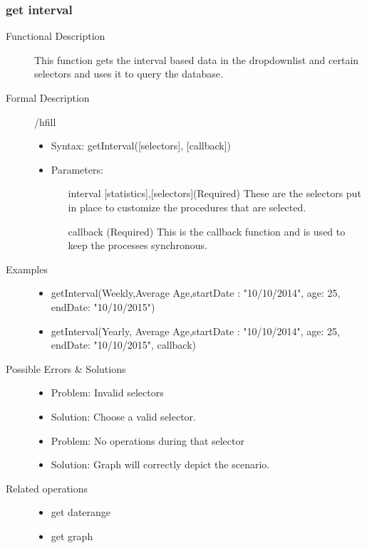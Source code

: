 \documentclass[14pt, a4paper]{article}
\begin{document}
\subsubsection{get interval}
\begin{description}
\item[Functional Description] This function gets the interval based data in the dropdownlist and certain selectors and uses it to query the database.
\item[Formal Description]/hfill
\begin{itemize}
	\item Syntax: getInterval([selectors], [callback])\\
	\item Parameters:
		\begin{itemize}
			\item [interval][statistics],[selectors](Required) These are the selectors put in place to customize the procedures that are selected.
			\item [callback](Required) This is the callback function and is used to keep the processes synchronous.
		\end{itemize}
\end{itemize}
\item[Examples]\hfill
\begin{itemize}
	\item getInterval(Weekly,Average Age,{startDate : "10/10/2014", age: 25, endDate: "10/10/2015"})
	\item getInterval(Yearly, Average Age,{startDate : "10/10/2014", age: 25, endDate: "10/10/2015"}, callback)
\end{itemize}
\item[Possible Errors \& Solutions]
\begin{itemize}
	\item Problem: Invalid selectors
	\item Solution: Choose a valid selector.
	\item Problem: No operations during that selector
	\item Solution: Graph will correctly depict the scenario.
\end{itemize}
\item[Related operations] \hfill
\begin{itemize}
	\item get daterange
	\item get graph
\end{itemize}
\end{description}
\end{document}
